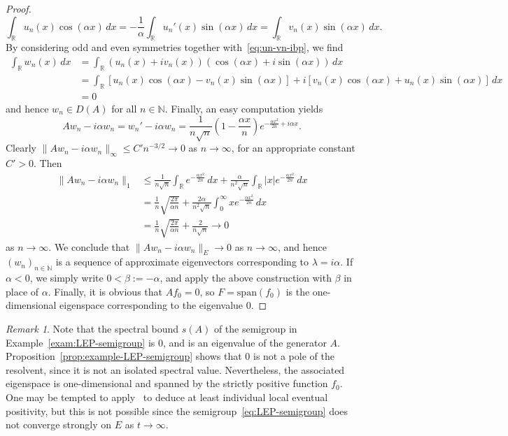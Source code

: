 \documentclass[a4paper, reqno]{amsart}
\numberwithin{equation}{section}
\theoremstyle{plain}
\theoremstyle{definition}
\theoremstyle{remark}
\newtheorem{remark}[theorem]{Remark}
\newcommand{\NN}{\mathbb{N}}
\newcommand{\RR}{\mathbb{R}}
\begin{document}
\begin{proof}
\begin{equation}
		\label{eq:un-vn-ibp}
		\int_\RR u_n(x)\cos(\alpha x) \,dx = -\frac{1}{\alpha} \int_\RR u_n'(x) \sin(\alpha x) \,dx = \int_\RR v_n(x)\sin(\alpha x)\,dx.
	\end{equation}
	By considering odd and even symmetries together with~\eqref{eq:un-vn-ibp}, we find
	\begin{align*}
		\int_\RR w_n(x) \,dx &= \int_\RR (u_n(x) + iv_n(x))(\cos(\alpha x)+i\sin(\alpha x)) \,dx \\
		&= \int_\RR [u_n(x)\cos(\alpha x) - v_n(x)\sin(\alpha x)] + i[v_n(x)\cos(\alpha x)+u_n(x)\sin(\alpha x)] \,dx \\
		&= 0
	\end{align*}
	and hence $w_n \in D(A)$ for all $n\in\NN$. Finally, an easy computation yields
	\begin{equation*}
		Aw_n - i\alpha w_n = w_n' - i\alpha w_n = \frac{1}{n\sqrt{n}}\left(1-\frac{\alpha x}{n}\right) e^{-\frac{\alpha x^2}{2n}+i\alpha x}.
	\end{equation*}
	Clearly $\|Aw_n - i\alpha w_n\|_\infty \le C'n^{-3/2} \to 0$ as $n\to\infty$, for an appropriate constant $C'>0$. Then
	\begin{align*}
		\|Aw_n - i\alpha w_n\|_1 &\le \frac{1}{n\sqrt{n}}\int_\RR e^{-\frac{\alpha x^2}{2n}} \,dx + \frac{\alpha}{n^2\sqrt{n}}\int_\RR |x| e^{-\frac{\alpha x^2}{2n}} \,dx \\
		&= \frac{1}{n}\sqrt{\frac{2\pi}{\alpha n}} + \frac{2\alpha}{n^2\sqrt{n}}\int_0^\infty xe^{-\frac{\alpha x^2}{2n}} \,dx \\
		&= \frac{1}{n}\sqrt{\frac{2\pi}{\alpha n}} + \frac{2}{n\sqrt{n}} \longrightarrow 0
	\end{align*}
	as $n\to\infty$. We conclude that $\|Aw_n - i\alpha w_n\|_E \to 0$ as $n\to\infty$, and hence $(w_n)_{n\in\NN}$ is a sequence of approximate eigenvectors corresponding to $\lambda=i\alpha$. If $\alpha<0$, we simply write $0<\beta:=-\alpha$, and apply the above construction with $\beta$ in place of $\alpha$. Finally, it is obvious that $Af_0 = 0$, so $F = \mathrm{span}(f_0)$ is the one-dimensional eigenspace corresponding to the eigenvalue 0.
\end{proof}

\begin{remark}
	Note that the spectral bound $s(A)$ of the semigroup in Example~\ref{exam:LEP-semigroup} is $0$, and is an eigenvalue of the generator $A$. Proposition~\ref{prop:example-LEP-semigroup} shows that $0$ is not a pole of the resolvent, since it is not an isolated spectral value. Nevertheless, the associated eigenspace is one-dimensional and spanned by the strictly positive function $f_0$. One may be tempted to apply~\cite[Theorem 3.3]{Ar21} to deduce at least individual local eventual positivity, but this is not possible since the semigroup~\eqref{eq:LEP-semigroup} does not converge strongly on $E$ as $t\to\infty$.
\end{remark}
\end{document}
